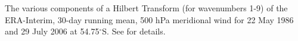 \label{fig:example_figure}
The various components of a Hilbert Transform (for wavenumbers 1-9) of the ERA-Interim, 30-day running mean, 500 hPa meridional wind for 22 May 1986 and 29 July 2006 at 54.75$^{\circ}$S. See \citet{Irving2016} for details. 
  